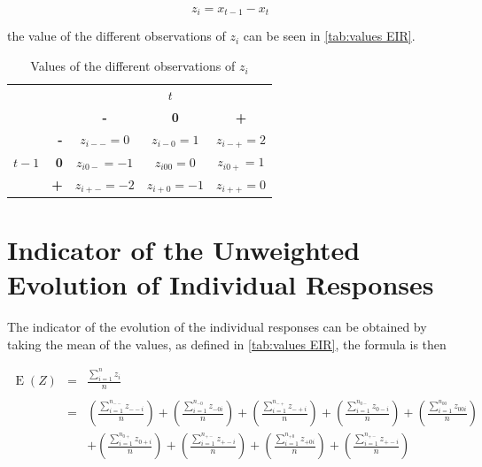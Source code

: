 \documentclass[12pt,a4paper,oneside]{book}
\DeclareMathOperator{\E}{E}
\begin{document}
\begin{equation}
    z_i = x_{t-1} - x_{t}
\end{equation}

the value of the different observations of $z_i$ can be seen in \autoref{tab:values EIR}. 

\begin{table}[H]
    \centering
    \begin{tabular}{r | r | c c c | }
    \multicolumn{1}{r}{} & \multicolumn{1}{r}{} &    \multicolumn{3}{c}{$t$} \\ \cline{3-5}
    \multicolumn{1}{r}{} &         & \textbf{-} & \textbf{0} & \textbf{+} \\ \cline{2-5}
           &    \textbf{-} & $z_{i--}=0$    & $z_{i-0}=1$    & $z_{i-+}=2$ \\ 
    $t-1$ & \textbf{0}  & $z_{i0-}=-1$    & $z_{i00}=0$    & $z_{i0+}=1$    \\
            & \textbf{+}& $z_{i+-}=-2$    & $z_{i+0}=-1$    & $z_{i++}=0$ \\ \cline{2-5}
\end{tabular}
    \caption{Values of the different observations of $z_i$}
    \label{tab:values EIR}
\end{table}{}

\section{Indicator of the Unweighted Evolution of Individual Responses}


The indicator of the evolution of the individual responses can be obtained by taking the mean of the values, as defined in \autoref{tab:values EIR}, the formula is then

\begin{eqnarray}
    \E(Z) &=&  \frac{ \sum_{i=1}^n z_i}{n} \\ \nonumber \\
        &=& \left( \frac{ \sum_{i=1}^{n_{--}} z_{--i}}{n} \right)
     + \left( \frac{\sum_{i=1}^{n_{-0}} z_{-0i} }{n} \right)
    + \left( \frac{\sum_{i=1}^{n_{-+}} z_{-+i}}{n} \right)
    + \left( \frac{\sum_{i=1}^{n_{0-}} z_{0-i} }{n} \right)
    + \left( \frac{\sum_{i=1}^{n_{00}} z_{00i} }{n} \right) \nonumber  \\
    &&  + \left( \frac{\sum_{i=1}^{n_{0+}} z_{0+i}}{n} \right)
    + \left( \frac{\sum_{i=1}^{n_{+-}} z_{+-i} }{n} \right)
    + \left( \frac{\sum_{i=1}^{n_{+0}} z_{+0i} }{n} \right)
    + \left( \frac{\sum_{i=1}^{n_{+-}} z_{+-i}}{n} \right)
\end{eqnarray}
\end{document}
